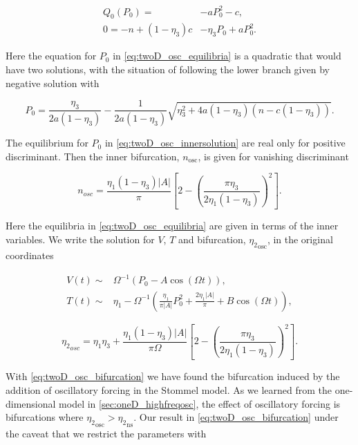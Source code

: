 \begin{equation}\label{eq:twoD_osc_equilibria}
\begin{aligned}
Q_0(P_0)=&-aP_0^2-c,\\
0=-n+(1-\eta_3)c&-\eta_3 P_0+aP_0^2.
\end{aligned}
\end{equation}

Here the equation for $P_0$ in \eqref{eq:twoD_osc_equilibria} is a quadratic that would have two solutions, with the situation of following the lower branch given by negative solution with

\begin{equation}\label{eq:twoD_osc_innersolution}
P_0=\frac{\eta_3}{2a(1-\eta_3)}- \frac{1}{2a(1-\eta_3)}\sqrt{\eta_3^2+4a(1-\eta_3)(n-c(1-\eta_3))}.
\end{equation}

The equilibrium for $P_0$ in \eqref{eq:twoD_osc_innersolution} are real only for positive discriminant. Then the inner bifurcation, $n_{\text{osc}}$, is given for vanishing discriminant 

\begin{equation}\label{eq:twoD_osc_innerbif}
n_{osc} = \frac{\eta_1(1-\eta_3)|A|}{\pi}\left[2-\left(\frac{\pi\eta_3}{2\eta_1(1-\eta_3)}\right)^2\right].
\end{equation}

Here the equilibria in \eqref{eq:twoD_osc_equilibria} are given in terms of the inner variables. We write the solution for $V$, $T$ and bifurcation, ${\eta_2}_{\text{osc}}$, in the original coordinates

\begin{equation}\label{eq:twoD_osc_innersolnoriginal}
\begin{aligned}
V(t)\sim& \Omega^{-1}\left(P_0-A\cos(\Omega t)\right),\\
T(t)\sim& \eta_1-\Omega^{-1}\left(\frac{\eta_1}{\pi|A|}P_0^2+\frac{2\eta_1|A|}{\pi}+B\cos(\Omega t)\right),
\end{aligned}
\end{equation}

\begin{equation}\label{eq:twoD_osc_bifurcation}
{\eta_2}_{osc} = \eta_1\eta_3+\frac{\eta_1(1-\eta_3)|A|}{\pi\Omega}\left[2-\left(\frac{\pi\eta_3}{2\eta_1(1-\eta_3)}\right)^2\right].
\end{equation}

With \eqref{eq:twoD_osc_bifurcation} we have found the bifurcation induced by the addition of oscillatory forcing in the Stommel model. As we learned from the one-dimensional model in \autoref{sec:oneD_highfreqosc}, the effect of oscillatory forcing is bifurcations where ${\eta_2}_{\text{osc}}>{\eta_2}_{\text{ns}}$. Our result in \eqref{eq:twoD_osc_bifurcation} under the caveat that we restrict the parameters with 

